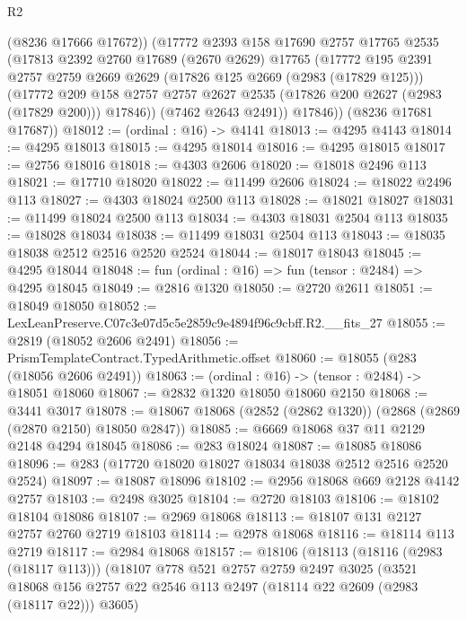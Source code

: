 \begin{lexlean}{R2}
\begin{coremodule}
          (@8236 @17666 @17672))
        (@17772
          @2393
          @158
          @17690
          @2757
          @17765
          @2535
          (@17813
            @2392
            @2760
            @17689
            (@2670 @2629)
            @17765
            (@17772
              @195
              @2391
              @2757
              @2759
              @2669
              @2629
              (@17826 @125 @2669 (@2983 (@17829 @125)))
              (@17772
                @209
                @158
                @2757
                @2757
                @2627
                @2535
                (@17826 @200 @2627 (@2983 (@17829 @200)))
                @17846))
            (@7462 @2643 @2491))
          @17846))
      (@8236 @17681 @17687))
@18012 := (ordinal : @16) -> @4141
@18013 := @4295 @4143
@18014 := @4295 @18013
@18015 := @4295 @18014
@18016 := @4295 @18015
@18017 := @2756 @18016
@18018 := @4303 @2606
@18020 := @18018 @2496 @113
@18021 := @17710 @18020
@18022 := @11499 @2606
@18024 := @18022 @2496 @113
@18027 := @4303 @18024 @2500 @113
@18028 := @18021 @18027
@18031 := @11499 @18024 @2500 @113
@18034 := @4303 @18031 @2504 @113
@18035 := @18028 @18034
@18038 := @11499 @18031 @2504 @113
@18043 := @18035 @18038 @2512 @2516 @2520 @2524
@18044 := @18017 @18043
@18045 := @4295 @18044
@18048 := fun (ordinal : @16) => fun (tensor : @2484) => @4295 @18045
@18049 := @2816 @1320
@18050 := @2720 @2611
@18051 := @18049 @18050
@18052 := LexLeanPreserve.C07c3e07d5c5e2859c9e4894f96c9cbff.R2.__fits_27
@18055 := @2819 (@18052 @2606 @2491)
@18056 := PrismTemplateContract.TypedArithmetic.offset
@18060 := @18055 (@283 (@18056 @2606 @2491))
@18063 := (ordinal : @16) -> (tensor : @2484) -> @18051 @18060
@18067 := @2832 @1320 @18050 @18060 @2150
@18068 := @3441 @3017
@18078 := @18067 @18068 (@2852 (@2862 @1320)) (@2868 (@2869 (@2870 @2150) @18050 @2847))
@18085 := @6669 @18068 @37 @11 @2129 @2148 @4294 @18045
@18086 := @283 @18024
@18087 := @18085 @18086
@18096 := @283 (@17720 @18020 @18027 @18034 @18038 @2512 @2516 @2520 @2524)
@18097 := @18087 @18096
@18102 := @2956 @18068 @669 @2128 @4142 @2757
@18103 := @2498 @3025
@18104 := @2720 @18103
@18106 := @18102 @18104 @18086
@18107 := @2969 @18068
@18113 := @18107 @131 @2127 @2757 @2760 @2719 @18103
@18114 := @2978 @18068
@18116 := @18114 @113 @2719
@18117 := @2984 @18068
@18157 := @18106
    (@18113
      (@18116 (@2983 (@18117 @113)))
      (@18107
        @778
        @521
        @2757
        @2759
        @2497
        @3025
        (@3521 @18068 @156 @2757 @22 @2546 @113 @2497 (@18114 @22 @2609 (@2983 (@18117 @22))) @3605)

\end{coremodule}
\end{lexlean}

